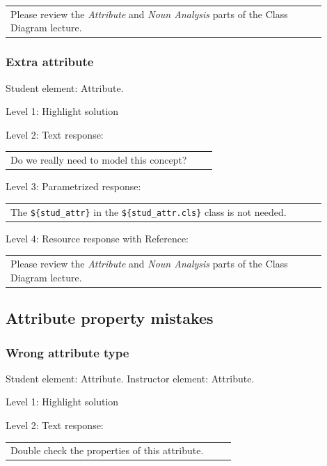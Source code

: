 \begin{tabular}{|p{0.9\linewidth}}
Please review the \textit{Attribute} and \textit{Noun Analysis} parts of the Class Diagram lecture.
\end{tabular} \medskip


\subsubsection{Extra attribute}

Student element: Attribute.  \medskip

\noindent Level 1: Highlight solution  \medskip

\noindent Level 2: Text response: \medskip

\begin{tabular}{|p{0.9\linewidth}}
Do we really need to model this concept?
\end{tabular} \medskip

\noindent Level 3: Parametrized response: \medskip

\begin{tabular}{|p{0.9\linewidth}}
The \verb|${stud_attr}| in the \verb|${stud_attr.cls}| class is not needed.
\end{tabular} \medskip

\noindent Level 4: Resource response with Reference: \medskip

\begin{tabular}{|p{0.9\linewidth}}
Please review the \textit{Attribute} and \textit{Noun Analysis} parts of the Class Diagram lecture.
\end{tabular} \medskip


\subsection{Attribute property mistakes}

\subsubsection{Wrong attribute type}

Student element: Attribute. Instructor element: Attribute. \medskip

\noindent Level 1: Highlight solution  \medskip

\noindent Level 2: Text response: \medskip

\begin{tabular}{|p{0.9\linewidth}}
Double check the properties of this attribute.
\end{tabular} \medskip

